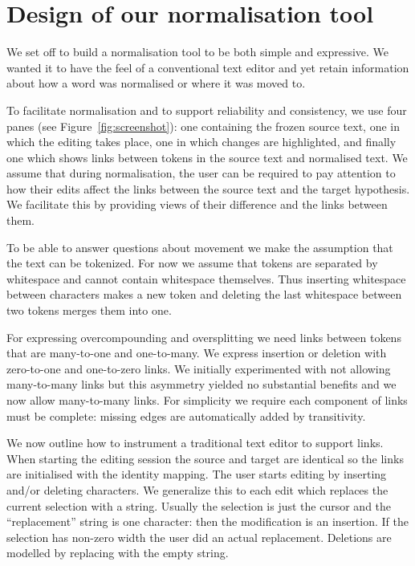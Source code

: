 \documentclass[10pt, a4paper]{article}
\begin{document}
\section{Design of our normalisation tool}
\label{sec:norm_tool}

We set off to build a normalisation tool to be both simple and expressive.
We wanted it to have the feel of a conventional text editor and yet retain
information about how a word was normalised or where it was moved to.

To facilitate normalisation and to support reliability and consistency,
we use four panes (see Figure~\ref{fig:screenshot}): one containing the
frozen source text, one in which the editing takes place, one in which
changes are highlighted, and finally one which shows links between tokens in the source text and normalised text. 
We assume that during normalisation, the user can be required to pay attention
to how their edits affect the links between the source text and the target
hypothesis. We facilitate this by providing views of their difference and
the links between them.

To be
able to answer questions about movement we make the assumption that the text
can be tokenized. For now we assume that tokens are separated by whitespace
and cannot contain whitespace themselves. Thus inserting whitespace between
characters makes a new token and deleting the last whitespace between two
tokens merges them into one.

For expressing overcompounding and oversplitting we need links between tokens
that are many-to-one and one-to-many. We express insertion or deletion with
zero-to-one and one-to-zero links. We initially experimented with not allowing
many-to-many links but this asymmetry yielded no substantial benefits
and we now allow many-to-many links.
For simplicity we require each component
of links must be complete: missing edges are automatically added by
transitivity.

We now outline how to instrument a traditional text editor to support links.
When starting the editing session the source and target are identical so the
links are initialised with the identity mapping. The user starts editing
by inserting and/or deleting characters.
We generalize this to each edit which replaces the current selection with a
string. Usually the selection is just the cursor and the ``replacement'' string
is one character: then the modification is an insertion.
If the selection has non-zero width the user did an actual replacement.
Deletions are modelled by replacing with the empty string.
\end{document}
